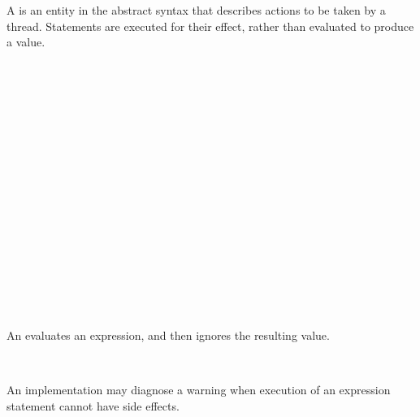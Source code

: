 
A  is an entity in the abstract syntax that describes actions to be taken by a thread.
Statements are executed for their effect, rather than evaluated to produce a value.

\begin{Syntax}
	 \\
		 \\
		\SynOr {} \\
		\SynOr {} \\
		\SynOr {} \\
		\SynOr {} \\
		\SynOr {} \\
		\SynOr {} \\
		\SynOr {} \\
		\SynOr {} \\
		\SynOr {} \\
		\SynOr {} \\
		\SynOr {} \\
		\SynOr {} \\
		\SynOr {} \\
		\SynOr {} \\
\end{Syntax}


\begin{Description}
An  evaluates an expression, and then ignores the resulting value.
\end{Description}

\begin{Syntax}
	 \\
		 \code{;}
\end{Syntax}

\begin{Checking}
\DerivationRule{
	\SynthJudgement{\ContextVarA}{\ExprVarE}{\TypeVarT}{\ContextVarB}
}{
	\CheckStmt{\ContextVarA}{\ExprVarE \code{;}}{\ContextVarB}
}
\end{Checking}

An implementation may diagnose a warning when execution of an expression statement cannot have side effects.

